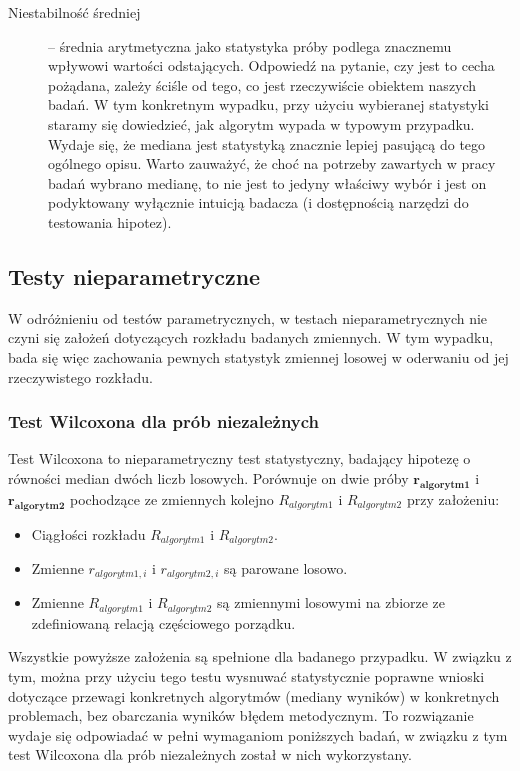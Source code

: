 \documentclass[12pt,a4paper]{report}
\begin{document}
{{{{{{\begin{description}
\item[Niestabilność średniej] -- średnia arytmetyczna jako statystyka próby podlega znacznemu wpływowi wartości odstających. Odpowiedź na pytanie, czy jest to cecha pożądana, zależy ściśle od tego, co jest rzeczywiście obiektem naszych badań. W tym konkretnym wypadku, przy użyciu wybieranej statystyki staramy się dowiedzieć, jak algorytm wypada w typowym przypadku. Wydaje się, że mediana jest statystyką znacznie lepiej pasującą do tego ogólnego opisu. Warto zauważyć, że choć na potrzeby zawartych w pracy badań wybrano medianę, to nie jest to jedyny właściwy wybór i jest on podyktowany wyłącznie intuicją badacza (i dostępnością narzędzi do testowania hipotez).
\end{description}
}
\subsection{Testy nieparametryczne}
\par{
W odróżnieniu od testów parametrycznych, w testach nieparametrycznych nie czyni się założeń dotyczących rozkładu badanych zmiennych. W tym wypadku, bada się więc zachowania pewnych statystyk zmiennej losowej w oderwaniu od jej rzeczywistego rozkładu.
}
\subsubsection{Test Wilcoxona dla prób niezależnych}
\label{Wilcoxon}
\par{
Test Wilcoxona \cite{mann1947} to nieparametryczny test statystyczny, badający hipotezę o równości median dwóch liczb losowych. Porównuje on dwie próby $\mathbf{r_{algorytm1}}$ i $\mathbf{r_{algorytm2}}$ pochodzące ze zmiennych kolejno $R_{algorytm1}$ i $R_{algorytm2}$ przy założeniu:
\begin{itemize}
\item Ciągłości rozkładu $R_{algorytm1}$ i $R_{algorytm2}$.
\item Zmienne $r_{algorytm1,i}$ i $r_{algorytm2,i}$ są parowane losowo.
\item Zmienne $R_{algorytm1}$ i $R_{algorytm2}$ są zmiennymi losowymi na zbiorze ze zdefiniowaną relacją częściowego porządku.
\end{itemize}
}
\par{
Wszystkie powyższe założenia są spełnione dla badanego przypadku. W związku z tym, można przy użyciu tego testu wysnuwać statystycznie poprawne wnioski dotyczące przewagi konkretnych algorytmów (mediany wyników) w konkretnych problemach, bez obarczania wyników błędem metodycznym. To rozwiązanie wydaje się odpowiadać w pełni wymaganiom poniższych badań, w związku z tym test Wilcoxona dla prób niezależnych został w nich wykorzystany.
}
}}}}}
\end{document}
